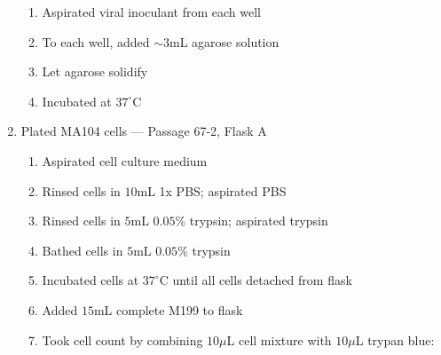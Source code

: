 \begin{enumerate}
\begin{enumerate}
				\item Aspirated viral inoculant from each well
				\item To each well, added $\sim3$mL agarose solution
				\item Let agarose solidify
				\item Incubated at $37^{\circ}$C
			\end{enumerate}
	\item Plated MA104 cells --- Passage 67-2, Flask A
			\begin{enumerate}
				\item Aspirated cell culture medium
				\item Rinsed cells in $10$mL 1x PBS; aspirated PBS
				\item Rinsed cells in $5$mL $0.05$\% trypsin; aspirated trypsin
				\item Bathed cells in $5$mL $0.05$\% trypsin
				\item Incubated cells at $37^{\circ}$C until all cells detached from flask
				\item Added $15$mL complete M199 to flask
				\item Took cell count by combining $10\mu$L cell mixture with $10\mu$L trypan blue:
				

\end{enumerate}
\end{enumerate}
